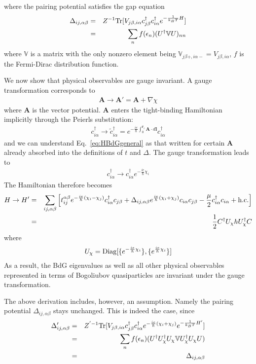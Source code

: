 where the pairing potential satisfies the gap equation
\begin{eqnarray}
	\Delta_{ij,\alpha\beta} &=& Z^{-1}{\rm Tr}[V_{j\beta,i\alpha}c_{j\beta}^\dag c^\dag_{i\alpha} e^{-\frac{1}{k_B T} H}] \\\nonumber
	&=& \sum_n f(\epsilon_n) (U^\dag {\mathbb{V}} U)_{nn}
\end{eqnarray}
where $\mathbb{V}$ is a matrix with the only nonzero element being $\mathbb{V}_{j\beta+,i\alpha-} = V_{j\beta, i\alpha}$, $f$ is the Fermi-Dirac distribution function.

We now show that physical observables are gauge invariant. A gauge transformation corresponds to
\begin{eqnarray}
	\mathbf A\rightarrow \mathbf A' = \mathbf A + \nabla \chi
\end{eqnarray}
where $\mathbf A$ is the vector potential. $\mathbf A$ enters the tight-binding Hamiltonian implicitly through the Peierls substitution:
\begin{eqnarray}\label{eq:peierls}
	c_{i\alpha}^\dag \rightarrow \tilde{c}^\dag_{i\alpha} = e^{-\frac{ie}{\hbar} \int_0^{\mathbf r_i} \mathbf A\cdot d \mathbf l} c_{i\alpha}^\dag
\end{eqnarray}
and we can understand Eq.~\eqref{eq:HBdGgeneral} as that written for certain $\mathbf A$ already absorbed into the definitions of $t$ and $\Delta$. The gauge transformation leads to
\begin{eqnarray}
	c^\dag_{i\alpha} \rightarrow c^\dag_{i\alpha} e^{-\frac{ie}{\hbar}\chi_i}
\end{eqnarray}
The Hamiltonian therefore becomes
\begin{eqnarray}
	H\rightarrow H'&=& \sum_{ij,\alpha\beta}\left[ t_{ij}^{\alpha\beta} e^{-\frac{ie}{\hbar}(\chi_i - \chi_j)} c_{i\alpha}^\dag c_{j\beta} + \Delta_{ij,\alpha\beta} e^{\frac{ie}{\hbar}(\chi_i + \chi_j)}c_{i\alpha}c_{j\beta}  - \frac{\mu}{2}c_{i\alpha}^\dag c_{i\alpha} + {\rm h.c.} \right] \\\nonumber
	&=&\frac{1}{2}C^\dag U_\chi h U_\chi^\dag C
\end{eqnarray}
where
\begin{eqnarray}
	U_\chi = {\rm Diag}[\{e^{-\frac{ie}{\hbar}\chi_i}\},\{e^{\frac{ie}{\hbar}\chi_i}\}]
\end{eqnarray}
As a result, the BdG eigenvalues as well as all other physical observables represented in terms of Bogoliubov quasiparticles are invariant under the gauge transformation.

The above derivation includes, however, an assumption. Namely the pairing potential $\Delta_{ij,\alpha\beta}$ stays unchanged. This is indeed the case, since
\begin{eqnarray}
	\Delta'_{ij,\alpha\beta} &=& Z^{'-1}{\rm Tr}[V_{j\beta,i\alpha} c^\dag_{j\beta}c^{\dag}_{i\alpha} e^{-\frac{ie}{\hbar}(\chi_i + \chi_j)} e^{-\frac{1}{k_B T}H'}] \\\nonumber
	&=& \sum_{n}f(\epsilon_n) (U^\dag U^\dag_\chi U_\chi \mathbb{V} U_\chi^\dag U_\chi U) \\\nonumber
	&=&\Delta_{ij,\alpha\beta}
\end{eqnarray}


